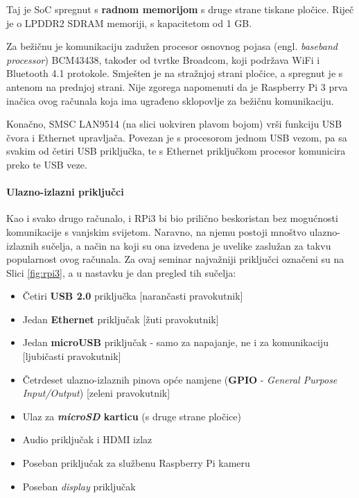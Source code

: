 \documentclass[12pt,a4paper]{article}
\begin{document}
		\par Taj je SoC spregnut s \textbf{radnom memorijom} s druge strane tiskane pločice. Riječ je o LPDDR2 SDRAM memoriji, s kapacitetom od 1 GB.

		\par Za bežičnu je komunikaciju zadužen procesor osnovnog pojasa (engl. \textit{baseband processor}) BCM43438, također od tvrtke Broadcom, koji podržava WiFi i Bluetooth 4.1 protokole. Smješten je na stražnjoj strani pločice, a spregnut je s antenom na prednjoj strani. Nije zgorega napomenuti da je Raspberry Pi 3 prva inačica ovog računala koja ima ugrađeno sklopovlje za bežičnu komunikaciju.

		\par Konačno, SMSC LAN9514 (na slici uokviren plavom bojom) vrši funkciju USB čvora i Ethernet upravljača. Povezan je s procesorom jednom USB vezom, pa sa svakim od četiri USB priključka, te s Ethernet priključkom procesor komunicira preko te USB veze.

		\paragraph{Ulazno-izlazni priključci} %
		\label{par:IO_ports}
		
		Kao i svako drugo računalo, i RPi3 bi bio prilično beskoristan bez mogućnosti komunikacije s vanjskim svijetom. Naravno, na njemu postoji mnoštvo ulazno-izlaznih sučelja, a način na koji su ona izvedena je uvelike zaslužan za takvu popularnost ovog računala. Za ovaj seminar najvažniji priključci označeni su na Slici \ref{fig:rpi3}, a u nastavku je dan pregled tih sučelja:
		\begin{itemize}
			\item Četiri \textbf{USB 2.0} priključka [narančasti pravokutnik]
			\item Jedan \textbf{Ethernet} priključak [žuti pravokutnik]
			\item Jedan \textbf{microUSB} priključak - samo za napajanje, ne i za komunikaciju [ljubičasti pravokutnik]
			\item Četrdeset ulazno-izlaznih pinova opće namjene (\textbf{GPIO} - \textit{General Purpose Input/Output}) [zeleni pravokutnik]
			\item Ulaz za \textbf{\textit{microSD} karticu} (s druge strane pločice)
			\item Audio priključak i HDMI izlaz
			\item Poseban priključak za službenu Raspberry Pi kameru
			\item Poseban \textit{display} priključak
		\end{itemize}
\end{document}
